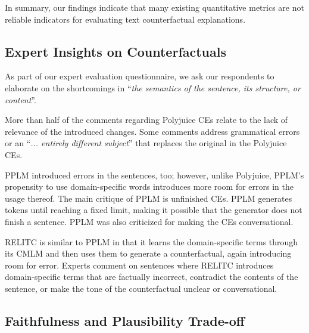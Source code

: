\documentclass[11pt]{article}
\begin{document}
In summary, our findings indicate that many existing quantitative metrics are not reliable indicators for evaluating text counterfactual explanations. 

\subsection{Expert Insights on Counterfactuals}\label{sec:expert-comments}

As part of our expert evaluation questionnaire, we ask our respondents to elaborate on the shortcomings in ``\textit{the semantics of the \text{[counterfactual]} sentence, its structure, or content}''.

More than half of the comments regarding Polyjuice CEs relate to the lack of relevance of the introduced changes. Some comments address grammatical errors or an ``\textit{... entirely different subject}'' that replaces the original in the Polyjuice CEs.

PPLM introduced errors in the sentences, too; however, unlike Polyjuice, PPLM's propensity to use domain-specific words introduces more room for errors in the usage thereof. The main critique of PPLM is unfinished CEs. PPLM generates tokens until reaching a fixed limit, making it possible that the generator does not finish a sentence. PPLM was also criticized for making the CEs conversational.

RELITC is similar to PPLM in that it learns the domain-specific terms through its CMLM and then uses them to generate a counterfactual, again introducing room for error. Experts comment on sentences where RELITC introduces domain-specific terms that are factually incorrect, contradict the contents of the sentence, or make the tone of the counterfactual unclear or conversational.

\subsection{Faithfulness and Plausibility Trade-off}
\end{document}
